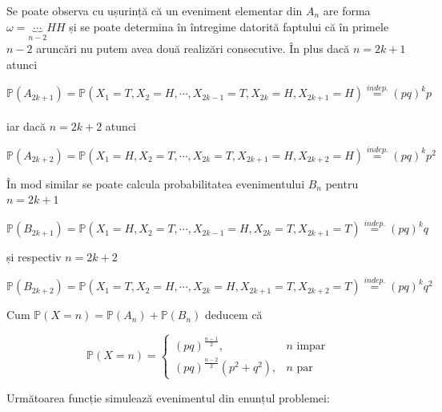 \documentclass[]{article}
\begin{document}
Se poate observa cu ușurință că un eveniment elementar din \(A_n\) are
forma \(\omega = \underbrace{\cdots}_{n-2} HH\) și se poate determina în
întregime datorită faptului că în primele \(n-2\) aruncări nu putem avea
două realizări consecutive. În plus dacă \(n = 2k+1\) atunci

\[
  \mathbb{P}(A_{2k+1}) = \mathbb{P}(X_1 = T, X_2 = H, \cdots, X_{2k-1}=T, X_{2k} = H, X_{2k+1} = H) \overset{indep.}{=} (pq)^kp 
\]\\
iar dacă \(n=2k+2\) atunci

\[
  \mathbb{P}(A_{2k+2}) = \mathbb{P}(X_1 = H, X_2 = T, \cdots, X_{2k}=T, X_{2k+1} = H, X_{2k+2} = H) \overset{indep.}{=} (pq)^kp^2 
\]

În mod similar se poate calcula probabilitatea evenimentului \(B_n\)
pentru \(n=2k+1\)

\[
  \mathbb{P}(B_{2k+1}) = \mathbb{P}(X_1 = H, X_2 = T, \cdots, X_{2k-1} = H, X_{2k} = T, X_{2k+1} = T) \overset{indep.}{=} (pq)^kq 
\]

și respectiv \(n=2k+2\)

\[
  \mathbb{P}(B_{2k+2}) = \mathbb{P}(X_1 = T, X_2 = H, \cdots, X_{2k} = H, X_{2k+1} = T, X_{2k+2} = T) \overset{indep.}{=} (pq)^kq^2 
\]

Cum \(\mathbb{P}(X=n) = \mathbb{P}(A_n) + \mathbb{P}(B_n)\) deducem că

\[
  \mathbb{P}(X=n) =\left\{\begin{array}{ll}
      (pq)^{\frac{n-1}{2}}, & \text{$n$ impar}\\
      (pq)^{\frac{n-2}{2}}(p^2+q^2), & \text{$n$ par}
  \end{array}\right.
\]

Următoarea funcție simulează evenimentul din enunțul problemei:
\end{document}
